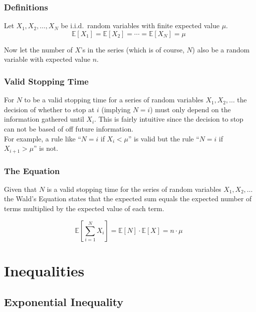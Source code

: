 \subsection*{Definitions}
Let $X_1,X_2,\dots, X_N$ be i.i.d.\ random variables with finite expected value $\mu$.
\[
\mathbb E[X_1]=\mathbb E[X_2]=\cdots=\mathbb E[X_N]=\mu
\]

Now let the number of $X$'s in the series (which is of course, $N$) also be a random variable 
with expected value $n$.

\subsection*{Valid Stopping Time}
For $N$ to be a valid stopping time for a series of random variables $X_1,X_2,\dots$ the decision 
of whether to stop at $i$ (implying $N=i$) must only depend on the information gathered until $X_{i}$. This is 
fairly intuitive since the decision to stop can not be based of off future information. \\

\noindent For example, a rule like ``$N=i$ if $X_i<\mu$'' is valid but the rule ``$N=i$ if $X_{i+1}>\mu$'' is not.

\subsection*{The Equation}
\noindent Given that $N$ is a valid stopping time for the series of random variables $X_1,X_2,\dots$ the 
Wald's Equation states that the expected sum equals the expected number of terms multiplied 
by the expected value of each term.

\[
\mathbb E\!\left[\sum_{i=1}^{N}X_i\right]
=
\mathbb E[N]\cdot\mathbb E[X]
=
n\cdot\mu
\]

\chapter{Inequalities}
\section{Exponential Inequality}
\label{exp_inequality}

